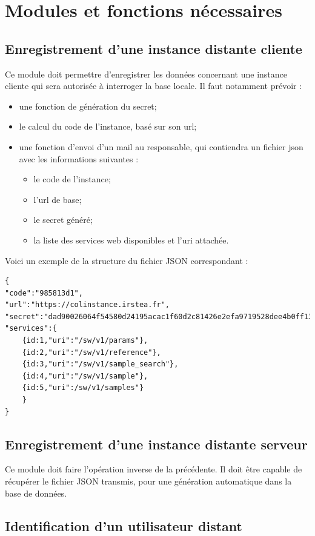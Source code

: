\section{Modules et fonctions nécessaires}
\subsection{Enregistrement d'une instance distante cliente}
Ce module doit permettre d'enregistrer les données concernant une instance cliente qui sera autorisée à interroger la base locale. Il faut notamment prévoir :
\begin{itemize}
\item une fonction de génération du secret;
\item le calcul du code de l'instance, basé sur son url;
\item une fonction d'envoi d'un mail au responsable, qui contiendra un fichier json avec les informations suivantes :
\begin{itemize}
\item le code de l'instance;
\item l'url de base;
\item le secret généré;
\item la liste des services web disponibles et l'uri attachée.
\end{itemize}
\end{itemize}

Voici un exemple de la structure du fichier JSON correspondant :
\begin{lstlisting}
{
"code":"985813d1",
"url":"https://colinstance.irstea.fr",
"secret":"dad90026064f54580d24195acac1f60d2c81426e2efa9719528dee4b0ff13668",
"services":{
	{id:1,"uri":"/sw/v1/params"},
	{id:2,"uri":"/sw/v1/reference"},
	{id:3,"uri":"/sw/v1/sample_search"},
	{id:4,"uri":"/sw/v1/sample"},
	{id:5,"uri":/sw/v1/samples"}
	}
}
\end{lstlisting}

\subsection{Enregistrement d'une instance distante serveur}
Ce module doit faire l'opération inverse de la précédente. Il doit être capable de récupérer le fichier JSON transmis, pour une génération automatique dans la base de données.

\subsection{Identification d'un utilisateur distant}

